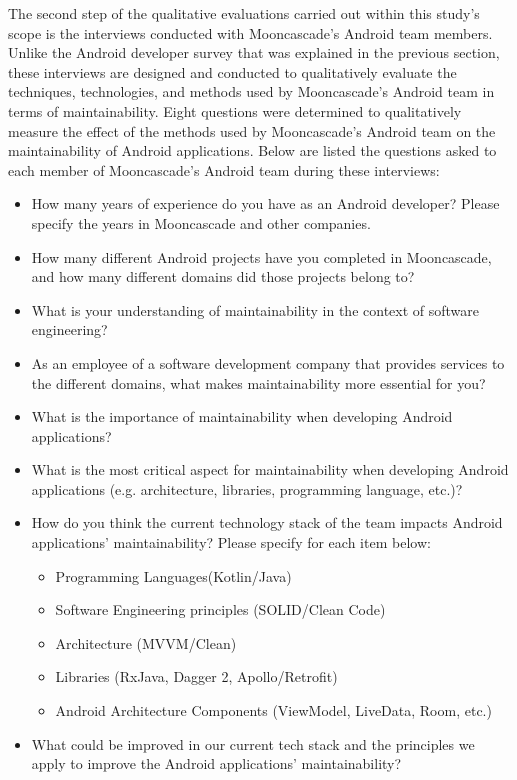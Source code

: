 The second step of the qualitative evaluations carried out within this study’s scope is the interviews conducted with Mooncascade's Android team members. Unlike the Android developer survey that was explained in the previous section, these interviews are designed and conducted to qualitatively evaluate the techniques, technologies, and methods used by Mooncascade's Android team in terms of maintainability. Eight questions were determined to qualitatively measure the effect of the methods used by Mooncascade's Android team on the maintainability of Android applications. Below are listed the questions asked to each member of Mooncascade's Android team during these interviews:
\begin{itemize}
    \item How many years of experience do you have as an Android developer? Please specify the years in Mooncascade and other companies.
    \item How many different Android projects have you completed in Mooncascade, and how many different domains did those projects belong to?
    \item What is your understanding of maintainability in the context of software engineering?
    \item As an employee of a software development company that provides services to the different domains, what makes maintainability more essential for you?
    \item What is the importance of maintainability when developing Android applications?
    \item What is the most critical aspect for maintainability when developing Android applications (e.g. architecture, libraries, programming language, etc.)?
    \item How do you think the current technology stack of the team impacts Android applications’ maintainability? Please specify for each item below:
    \begin{itemize}
        \item Programming Languages(Kotlin/Java)
        \item Software Engineering principles (SOLID/Clean Code)
        \item Architecture (MVVM/Clean)
        \item Libraries (RxJava, Dagger 2, Apollo/Retrofit)
        \item Android Architecture Components (ViewModel, LiveData, Room, etc.)
    \end{itemize}
    \item What could be improved in our current tech stack and the principles we apply to improve the Android applications’ maintainability?
\end{itemize}


